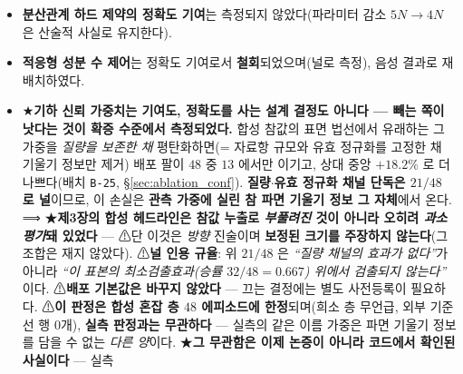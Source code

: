 \documentclass[11pt]{report}
\numberwithin{equation}{chapter}
\numberwithin{figure}{chapter}
\numberwithin{table}{chapter}
\begin{document}
\begin{itemize}
  \item \textbf{분산관계 하드 제약의 정확도 기여}는 측정되지 않았다(파라미터 감소
        $5N \to 4N$ 은 산술적 사실로 유지한다).
  \item \textbf{적응형 성분 수 제어}는 정확도 기여로서 \textbf{철회}되었으며(널로 측정),
        음성 결과로 재배치하였다.
  \item ★\textbf{기하 신뢰 가중치는 기여도, 정확도를 사는 설계 결정도 아니다 --- 빼는
        쪽이 낫다는 것이 확증 수준에서 측정되었다.} 합성 참값의 표면 법선에서 유래하는
        그 가중을 \emph{질량을 보존한 채} 평탄화하면(= 자료항 규모와 유효 정규화를 고정한
        채 기울기 정보만 제거) 배포 팔이 $48$ 중 $13$ 에서만 이기고, 상대 중앙
        $+18.2\%$ 로 더 나쁘다(배치 \texttt{B-25}, \S\ref{sec:ablation_conf}).
        \textbf{질량$\cdot$유효 정규화 채널 단독은 $21/48$ 로 널}이므로, 이 손실은
        \textbf{관측 가중에 실린 참 파면 기울기 정보 그 자체}에서 온다.
        ⟹ ★\textbf{제3장의 합성 헤드라인은 참값 누출로 \emph{부풀려진} 것이 아니라
        오히려 \emph{과소평가}돼 있었다} --- ⚠단 이것은 \emph{방향} 진술이며
        \textbf{보정된 크기를 주장하지 않는다}(그 조합은 재지 않았다).
        ⚠\textbf{널 인용 규율}: 위 $21/48$ 은 \emph{``질량 채널의 효과가 없다''}가 아니라
        \emph{``이 표본의 최소검출효과(승률 $32/48 = 0.667$) 위에서 검출되지 않는다''}
        이다. ⚠\textbf{배포 기본값은 바꾸지 않았다} --- 끄는 결정에는 별도 사전등록이
        필요하다. ⚠\textbf{이 판정은 합성 혼잡 층 $48$ 에피소드에 한정}되며(희소 층
        무언급, 외부 기준선 행 $0$개), \textbf{실측 판정과는 무관하다} --- 실측의
        같은 이름 가중은 파면 기울기 정보를 담을 수 없는 \emph{다른 양}이다.
        ★\textbf{그 무관함은 이제 논증이 아니라 코드에서 확인된 사실이다} --- 실측

\end{itemize}
\end{document}
